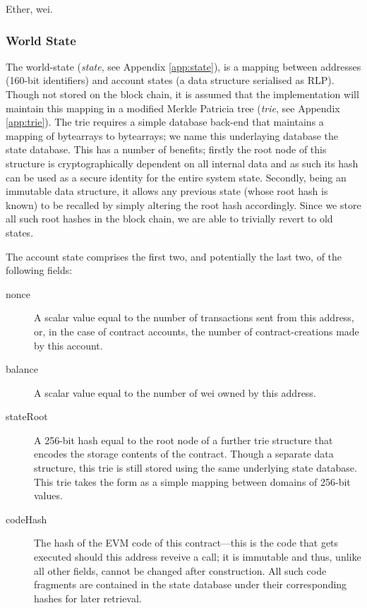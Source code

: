 \documentclass[9pt,oneside]{amsart}
\begin{document}
\begin{multicols}{2}
Ether, wei.

\subsubsection{World State} \label{ch:state}

The world-state (\textit{state}, see Appendix \ref{app:state}), is a mapping between addresses (160-bit identifiers) and account states (a data structure serialised as RLP). Though not stored on the block chain, it is assumed that the implementation will maintain this mapping in a modified Merkle Patricia tree (\textit{trie}, see Appendix \ref{app:trie}). The trie requires a simple database back-end that maintains a mapping of bytearrays to bytearrays; we name this underlaying database the state database. This has a number of benefits; firstly the root node of this structure is cryptographically dependent on all internal data and as such its hash can be used as a secure identity for the entire system state. Secondly, being an immutable data structure, it allows any previous state (whose root hash is known) to be recalled by simply altering the root hash accordingly. Since we store all such root hashes in the block chain, we are able to trivially revert to old states.

The account state comprises the first two, and potentially the last two, of the following fields:

\begin{description}
\item[nonce] A scalar value equal to the number of transactions sent from this address, or, in the case of contract accounts, the number of contract-creations made by this account.
\item[balance] A scalar value equal to the number of wei owned by this address.
\item[stateRoot] A 256-bit hash equal to the root node of a further trie structure that encodes the storage contents of the contract. Though a separate data structure, this trie is still stored using the same underlying state database. This trie takes the form as a simple mapping between domains of 256-bit values.
\item[codeHash] The hash of the EVM code of this contract---this is the code that gets executed should this address reveive a call; it is immutable and thus, unlike all other fields, cannot be changed after construction. All such code fragments are contained in the state database under their corresponding hashes for later retrieval.
\end{description}


\end{multicols}
\end{document}
